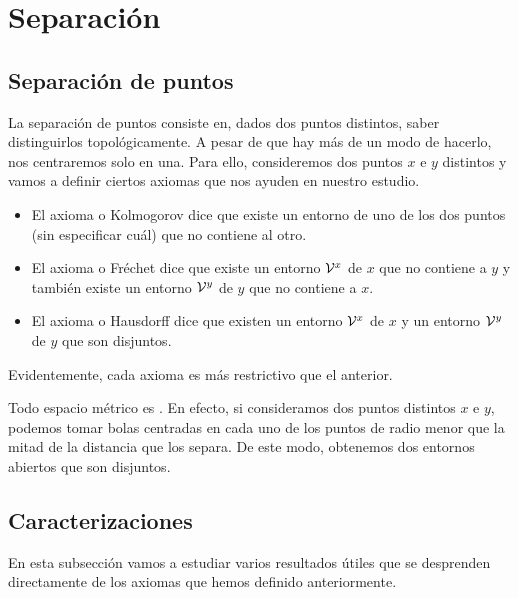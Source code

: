 \chapter{Separación}

\section{Separación de puntos} 

La separación de puntos consiste en, dados dos puntos distintos, saber distinguirlos topológicamente. A pesar de que hay más de un modo de hacerlo, nos centraremos solo en una. Para ello, consideremos dos puntos $x$ e $y$ distintos y vamos a definir ciertos axiomas que nos ayuden en nuestro estudio.

\begin{itemize}
\item El axioma \kolmogorov o Kolmogorov dice que existe un entorno de uno de los dos puntos (sin especificar cuál) que no contiene al otro. 
\item El axioma \frechet o Fréchet dice que existe un entorno $\mathcal{V}^x$ de $x$ que no contiene a $y$ y también existe un entorno $\mathcal{V}^y$ de $y$ que no contiene a $x$.
\item El axioma \hausdorff o Hausdorff dice que existen un entorno $\mathcal{V}^x$ de $x$ y un entorno $\mathcal{V}^y$ de $y$ que son disjuntos. 
\end{itemize}

Evidentemente, cada axioma es más restrictivo que el anterior. 

\begin{obs}
Todo espacio métrico es \hausdorff. En efecto, si consideramos dos puntos distintos $x$ e $y$, podemos tomar bolas centradas en cada uno de los puntos de radio menor que la mitad de la distancia que los separa. De este modo, obtenemos dos entornos abiertos que son disjuntos. 
\end{obs}

\section{Caracterizaciones}

En esta subsección vamos a estudiar varios resultados útiles que se desprenden directamente de los axiomas que hemos definido anteriormente. 

